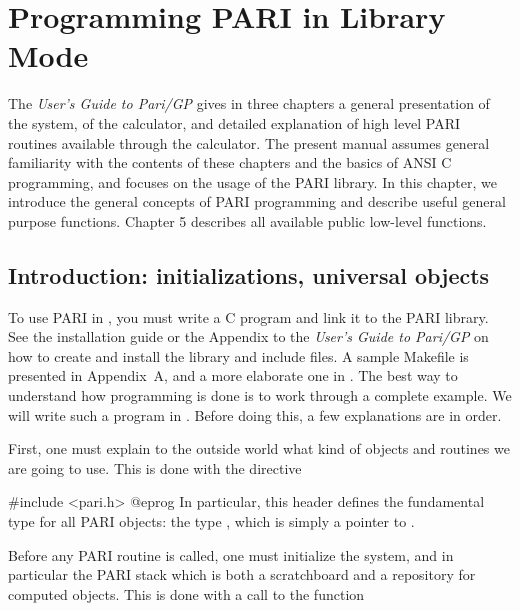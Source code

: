 %
%
\chapter{Programming PARI in Library Mode}

\noindent The \emph{User's Guide to Pari/GP} gives in three chapters a
general presentation of the system, of the  calculator, and detailed
explanation of high level PARI routines available through the calculator. The
present manual assumes general familiarity with the contents of these
chapters and the basics of ANSI C programming, and focuses on the usage of
the PARI library. In this chapter, we introduce the general concepts of PARI
programming and describe useful general purpose functions. Chapter 5
describes all available public low-level functions.

\section{Introduction: initializations, universal objects}
\label{se:intro4}

\noindent
To use PARI in , you must write a C program and link it to
the PARI library. See the installation guide or the Appendix to the
\emph{User's Guide to Pari/GP} on how to create and install the library and
include files. A sample Makefile is presented in Appendix~A, and a more
elaborate one in . The best way to understand how
programming is done is to work through a complete example. We will write such
a program in . Before doing this, a few explanations are in
order.

First, one must explain to the outside world what kind of objects and
routines we are going to use. This is done with the directive

\bprog
#include <pari.h>
@eprog
\noindent
In particular, this header defines the fundamental type for all PARI objects:
the type , which is simply a pointer to .

Before any PARI routine is called, one must initialize the system, and in
particular the PARI stack which is both a scratchboard and a repository for
computed objects. This is done with a call to the function


